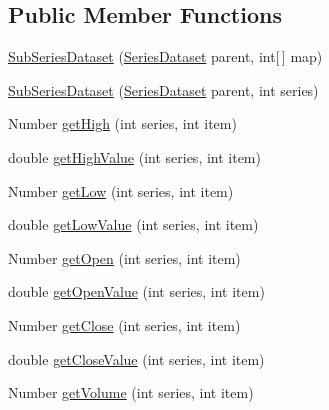 \subsection*{Public Member Functions}
\begin{DoxyCompactItemize}
\item 
\mbox{\hyperlink{classorg_1_1jfree_1_1data_1_1general_1_1_sub_series_dataset_a2d88e8f334a75634b4f47c7fbcdb1f65}{Sub\+Series\+Dataset}} (\mbox{\hyperlink{interfaceorg_1_1jfree_1_1data_1_1general_1_1_series_dataset}{Series\+Dataset}} parent, int\mbox{[}$\,$\mbox{]} map)
\item 
\mbox{\hyperlink{classorg_1_1jfree_1_1data_1_1general_1_1_sub_series_dataset_a4cf7071a07791c1790a06c3cc546a649}{Sub\+Series\+Dataset}} (\mbox{\hyperlink{interfaceorg_1_1jfree_1_1data_1_1general_1_1_series_dataset}{Series\+Dataset}} parent, int series)
\item 
Number \mbox{\hyperlink{classorg_1_1jfree_1_1data_1_1general_1_1_sub_series_dataset_a2aa5a696278793154f451fddbb698e1e}{get\+High}} (int series, int item)
\item 
double \mbox{\hyperlink{classorg_1_1jfree_1_1data_1_1general_1_1_sub_series_dataset_a63283b86bacb75de07fd3e4e8b5eae5b}{get\+High\+Value}} (int series, int item)
\item 
Number \mbox{\hyperlink{classorg_1_1jfree_1_1data_1_1general_1_1_sub_series_dataset_a317d15536060c58dbe89de699b605fc6}{get\+Low}} (int series, int item)
\item 
double \mbox{\hyperlink{classorg_1_1jfree_1_1data_1_1general_1_1_sub_series_dataset_ad14de9483cb4c2fa324f6064a6659228}{get\+Low\+Value}} (int series, int item)
\item 
Number \mbox{\hyperlink{classorg_1_1jfree_1_1data_1_1general_1_1_sub_series_dataset_aaa997e001d9ecd85cb2ecb628048e3ab}{get\+Open}} (int series, int item)
\item 
double \mbox{\hyperlink{classorg_1_1jfree_1_1data_1_1general_1_1_sub_series_dataset_a90452500367ee5658b035fb0e563fe0c}{get\+Open\+Value}} (int series, int item)
\item 
Number \mbox{\hyperlink{classorg_1_1jfree_1_1data_1_1general_1_1_sub_series_dataset_a0811cf5e7e6b2e05cd783980f1c17703}{get\+Close}} (int series, int item)
\item 
double \mbox{\hyperlink{classorg_1_1jfree_1_1data_1_1general_1_1_sub_series_dataset_abadc41ef36d20718c10f784dd786a5b1}{get\+Close\+Value}} (int series, int item)
\item 
Number \mbox{\hyperlink{classorg_1_1jfree_1_1data_1_1general_1_1_sub_series_dataset_aadeb99143b984112ba4fa142d0c0a931}{get\+Volume}} (int series, int item)

\end{DoxyCompactItemize}
